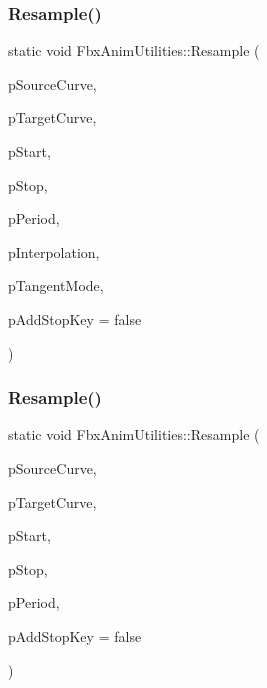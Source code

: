 \subsubsection{\texorpdfstring{Resample()}{Resample()}\hspace{0.1cm}{\footnotesize\ttfamily [1/3]}}
{\footnotesize\ttfamily static void Fbx\+Anim\+Utilities\+::\+Resample (\begin{DoxyParamCaption}\item[{\hyperlink{class_fbx_anim_curve}{Fbx\+Anim\+Curve} \&}]{p\+Source\+Curve,  }\item[{\hyperlink{class_fbx_anim_curve}{Fbx\+Anim\+Curve} \&}]{p\+Target\+Curve,  }\item[{\hyperlink{class_fbx_time}{Fbx\+Time} \&}]{p\+Start,  }\item[{\hyperlink{class_fbx_time}{Fbx\+Time} \&}]{p\+Stop,  }\item[{\hyperlink{class_fbx_time}{Fbx\+Time} \&}]{p\+Period,  }\item[{\hyperlink{class_fbx_anim_curve_def_add2ab7d10d856ab0868cc9b143d59ea5}{Fbx\+Anim\+Curve\+Def\+::\+E\+Interpolation\+Type}}]{p\+Interpolation,  }\item[{\hyperlink{class_fbx_anim_curve_def_ac810ccc5ca0527704ab5175479964b87}{Fbx\+Anim\+Curve\+Def\+::\+E\+Tangent\+Mode}}]{p\+Tangent\+Mode,  }\item[{bool}]{p\+Add\+Stop\+Key = {\ttfamily false} }\end{DoxyParamCaption})\hspace{0.3cm}{\ttfamily [static]}}

\mbox{\label{class_fbx_anim_utilities_a7ca36067a237e86124878d2000ddd9e5}} 
\subsubsection{\texorpdfstring{Resample()}{Resample()}\hspace{0.1cm}{\footnotesize\ttfamily [2/3]}}
{\footnotesize\ttfamily static void Fbx\+Anim\+Utilities\+::\+Resample (\begin{DoxyParamCaption}\item[{\hyperlink{class_fbx_anim_curve}{Fbx\+Anim\+Curve} \&}]{p\+Source\+Curve,  }\item[{\hyperlink{class_fbx_anim_curve}{Fbx\+Anim\+Curve} \&}]{p\+Target\+Curve,  }\item[{\hyperlink{class_fbx_time}{Fbx\+Time} \&}]{p\+Start,  }\item[{\hyperlink{class_fbx_time}{Fbx\+Time} \&}]{p\+Stop,  }\item[{\hyperlink{class_fbx_time}{Fbx\+Time} \&}]{p\+Period,  }\item[{bool}]{p\+Add\+Stop\+Key = {\ttfamily false} }\end{DoxyParamCaption})\hspace{0.3cm}{\ttfamily [static]}}

